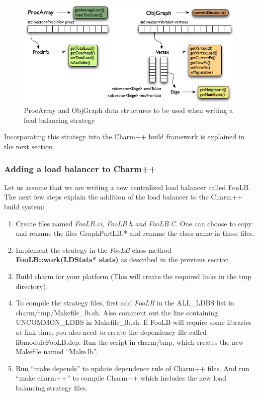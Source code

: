 \begin{figure}[h]
\centering
\includegraphics[width=6.0in]{fig/ckgraph.png}
\caption{ProcArray and ObjGraph data structures to be used when writing a load
balancing strategy}
\label{fig:ckgraph}
\end{figure}

Incorporating this strategy into the Charm++ build framework is explained in
the next section.

\subsubsection{Adding a load balancer to Charm++}

Let us assume that we are writing a new centralized load balancer called FooLB.
The next few steps explain the addition of the load balancer to the Charm++
build system:

\begin{enumerate}
\item Create files named {\em FooLB.ci, FooLB.h and FooLB.C}. One can choose to
copy and rename the files GraphPartLB.* and rename the class name in those
files.

\item Implement the strategy in the {\em FooLB} class method --- {\bf
FooLB::work(LDStats* stats)} as described in the previous section.

\item Build charm for your platform (This will create the required links in the
tmp directory).

\item To compile the strategy files, first add {\em FooLB} in the ALL\_LDBS
list in charm/tmp/Makefile\_lb.sh. Also comment out the line containing
UNCOMMON\_LDBS in Makefile\_lb.sh.  If FooLB will require some libraries at
link time, you also need to create the dependency file called
libmoduleFooLB.dep. Run the script in charm/tmp, which creates the new Makefile
named ``Make.lb''.

\item Run ``make depends'' to update dependence rule of Charm++ files.  And run
``make charm++'' to compile Charm++ which includes the new load balancing
strategy files.
\end{enumerate}


